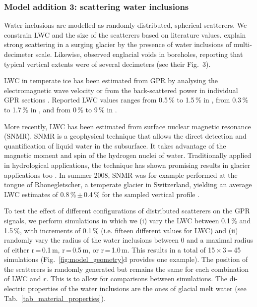 \subsubsection{Model addition 3: scattering water inclusions}
\label{sec:water}

Water inclusions are modelled as randomly distributed, spherical scatterers. We constrain LWC and the size of the scatterers based on literature values. \cite{Barrett&al2008} explain strong scattering in a surging glacier by the presence of water inclusions of multi-decimeter scale. Likewise, \cite{Hodge1976} observed englacial voids in boreholes, reporting that typical vertical extents were of several decimeters (see their Fig.~3).

LWC in temperate ice has been estimated from GPR by analysing the electromagnetic wave velocity \citep{Macheret&al1993,Moore&al1999,Murray&al2000} or from the back-scattered power in individual GPR sections \citep{Bamber1988,Hamran&al1996,Macheret&Glazovsky2000}. Reported LWC values ranges from 0.5\,\% to 1.5\,\% in \cite{Murray&al2000}, from 0.3\,\% to 1.7\,\% in \cite{Raymond&Harrison1975,Vallon&al1976}, and from 0\,\% to 9\,\% in \cite{Pettersson&al2004}. 

More recently, LWC has been estimated from surface nuclear magnetic resonance (SNMR). SNMR is a geophysical technique that allows the direct detection and quantification of liquid water in the subsurface. It takes advantage of the magnetic moment and spin of the hydrogen nuclei of water. Traditionally applied in hydrological applications, the technique has shown promising results in glacier applications too \citep[e.g.][]{Hertrich&al2007,Legchenko&al2011,Garambois&al2016}. In summer 2008, SNMR was for example performed at the tongue of Rhonegletscher, a temperate glacier in Switzerland, yielding an average LWC estimates of 0.8\,\%\,$\pm$\,0.4\,\% for the sampled vertical profile \citep{Hertrich&Walbrecker2008}. 

To test the effect of different configurations of distributed scatterers on the GPR signals, we perform simulations in which we (i) vary the LWC between 0.1\,\% and 1.5\,\%, with increments of 0.1\,\% (i.e. fifteen different values for LWC) and (ii) randomly vary the radius of the water inclusions between 0 and a maximal radius of either r\,=\,0.1\,m, r\,=\,0.5\,m, or r\,=\,1.0\,m. This results in a total of 15\,$\times$\,3\,=\,45 simulations (Fig.~\ref{fig:model_geometry}d provides one example). The position of the scatterers is randomly generated but remains the same for each combination of LWC and $r$. This is to allow for comparisons between simulations. The di-electric properties of the water inclusions are the ones of glacial melt water (see Tab.~\ref{tab_material_properties}). 


